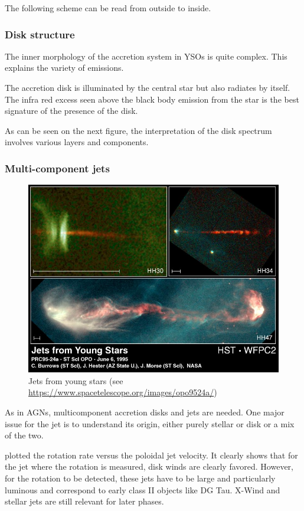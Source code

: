 \documentclass[10pt,a4paper,english]{article}
\begin{document}
The following scheme can be read from outside to inside.


\subsubsection{Disk structure}

The inner morphology of the accretion system in YSOs is quite complex. This
explains the variety of emissions.


The accretion disk is illuminated by the central star but also radiates by
itself. The infra red excess seen above the black body emission from the star
is the best signature of the presence of the disk.


As can be seen on the next figure, the interpretation of the disk spectrum
involves various layers and components.


\subsubsection{Multi-component jets}

\begin{figure}[!ht]
  \centering
  \includegraphics[width=0.5\columnwidth]{figures/jets_YSO.jpg}
  \caption{\label{fig:jets_yso} Jets from young stars (see \url{https://www.spacetelescope.org/images/opo9524a/})}
\end{figure}


As in AGNs, multicomponent accretion disks and jets are needed. One major issue
for the jet is to understand its origin, either purely stellar or disk or a mix
of the two.


\cite{2006A&A...453..785F} plotted the rotation rate versus the poloidal jet
velocity. It clearly shows that for the jet where the rotation is measured,
disk winds are clearly favored. However, for the rotation to be detected, these
jets have to be large and particularly luminous and correspond to early class
II objects like DG Tau. X-Wind and stellar jets are still relevant for later
phases.
\end{document}
